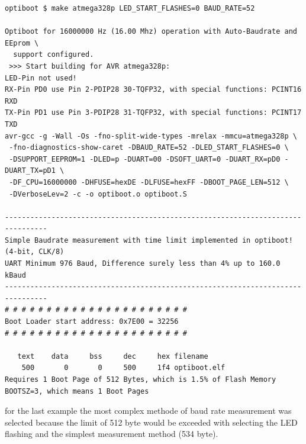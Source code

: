 \begin{verbatim}
optiboot $ make atmega328p LED_START_FLASHES=0 BAUD_RATE=52

Optiboot for 16000000 Hz (16.00 Mhz) operation with Auto-Baudrate and EEprom \
  support configured.
 >>> Start building for AVR atmega328p:
LED-Pin not used!
RX-Pin PD0 use Pin 2-PDIP28 30-TQFP32, with special functions: PCINT16 RXD
TX-Pin PD1 use Pin 3-PDIP28 31-TQFP32, with special functions: PCINT17 TXD
avr-gcc -g -Wall -Os -fno-split-wide-types -mrelax -mmcu=atmega328p \
 -fno-diagnostics-show-caret -DBAUD_RATE=52 -DLED_START_FLASHES=0 \
 -DSUPPORT_EEPROM=1 -DLED=p -DUART=00 -DSOFT_UART=0 -DUART_RX=pD0 -DUART_TX=pD1 \
 -DF_CPU=16000000 -DHFUSE=hexDE -DLFUSE=hexFF -DBOOT_PAGE_LEN=512 \
 -DVerboseLev=2 -c -o optiboot.o optiboot.S

--------------------------------------------------------------------------------
Simple Baudrate measurement with time limit implemented in optiboot! (4-bit, CLK/8)
UART Minimum 976 Baud, Difference surely less than 4% up to 160.0 kBaud
--------------------------------------------------------------------------------
# # # # # # # # # # # # # # # # # # # # # #
Boot Loader start address: 0x7E00 = 32256
# # # # # # # # # # # # # # # # # # # # # #

   text    data     bss     dec     hex filename
    500       0       0     500     1f4 optiboot.elf
Requires 1 Boot Page of 512 Bytes, which is 1.5% of Flash Memory
BOOTSZ=3, which means 1 Boot Pages

\end{verbatim}


for the last example the most complex methode of baud rate measurement
was selected because the limit of 512 byte would be exceeded with
selecting the LED flashing and the simplest measurement method (534 byte).

